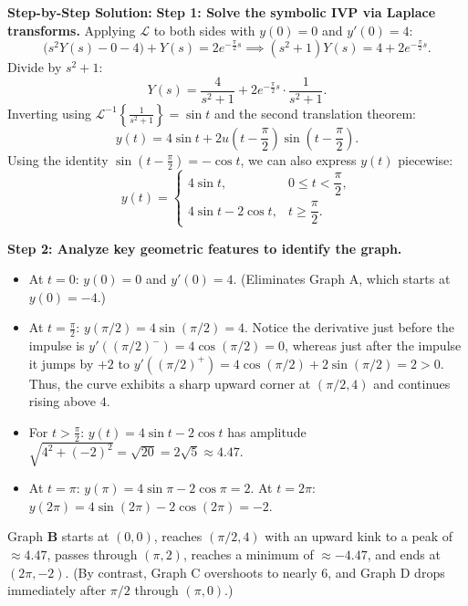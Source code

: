 \documentclass[11pt, letterpaper]{article}
\theoremstyle{definition}
\theoremstyle{remark}
\begin{document}
\textbf{Step-by-Step Solution:}
\textbf{Step 1: Solve the symbolic IVP via Laplace transforms.}
Applying $\mathcal{L}$ to both sides with $y(0) = 0$ and $y'(0) = 4$:
\[
    \bigl(s^2 Y(s) - 0 - 4\bigr) + Y(s) = 2e^{-\frac{\pi}{2}s} \implies (s^2 + 1)Y(s) = 4 + 2e^{-\frac{\pi}{2}s}.
\]
Divide by $s^2 + 1$:
\[
    Y(s) = \frac{4}{s^2 + 1} + 2e^{-\frac{\pi}{2}s}\cdot \frac{1}{s^2 + 1}.
\]
Inverting using $\mathcal{L}^{-1}\left\{\frac{1}{s^2 + 1}\right\} = \sin t$ and the second translation theorem:
\[
    y(t) = 4\sin t + 2u\left(t - \frac{\pi}{2}\right)\sin\left(t - \frac{\pi}{2}\right).
\]
Using the identity $\sin\left(t - \frac{\pi}{2}\right) = -\cos t$, we can also express $y(t)$ piecewise:
\[
    y(t) = \begin{cases} 4\sin t, & 0 \le t < \dfrac{\pi}{2}, \\[6pt] 4\sin t - 2\cos t, & t \ge \dfrac{\pi}{2}. \end{cases}
\]

\textbf{Step 2: Analyze key geometric features to identify the graph.}
\begin{itemize}
    \item At $t = 0$: $y(0) = 0$ and $y'(0) = 4$. (Eliminates Graph A, which starts at $y(0) = -4$.)
    \item At $t = \frac{\pi}{2}$: $y(\pi/2) = 4\sin(\pi/2) = 4$. Notice the derivative just before the impulse is $y'((\pi/2)^-) = 4\cos(\pi/2) = 0$, whereas just after the impulse it jumps by $+2$ to $y'((\pi/2)^+) = 4\cos(\pi/2) + 2\sin(\pi/2) = 2 > 0$. Thus, the curve exhibits a sharp upward corner at $(\pi/2, 4)$ and continues rising above $4$.
    \item For $t > \frac{\pi}{2}$: $y(t) = 4\sin t - 2\cos t$ has amplitude $\sqrt{4^2 + (-2)^2} = \sqrt{20} = 2\sqrt{5} \approx 4.47$.
    \item At $t = \pi$: $y(\pi) = 4\sin\pi - 2\cos\pi = 2$. At $t = 2\pi$: $y(2\pi) = 4\sin(2\pi) - 2\cos(2\pi) = -2$.
\end{itemize}
Graph \textbf{B} starts at $(0, 0)$, reaches $(\pi/2, 4)$ with an upward kink to a peak of $\approx 4.47$, passes through $(\pi, 2)$, reaches a minimum of $\approx -4.47$, and ends at $(2\pi, -2)$. (By contrast, Graph C overshoots to nearly $6$, and Graph D drops immediately after $\pi/2$ through $(\pi, 0)$.)
\end{document}
